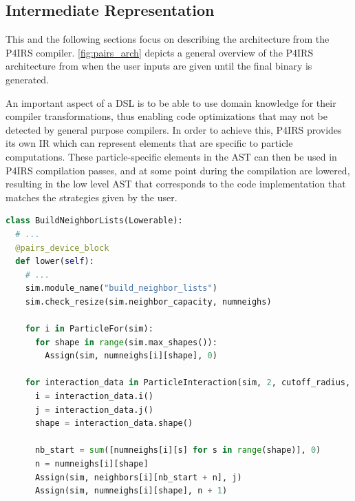 \documentclass[Afour,sageh,times]{sagej}
\newcommand{\RMchange}[1]{{\color{blue} #1}}
\begin{document}
\subsection{\RMchange{Intermediate Representation}}

\RMchange{This and the following sections focus on describing the architecture from the P4IRS compiler.
\autoref{fig:pairs_arch} depicts a general overview of the P4IRS architecture from when the user inputs are given until the final binary is generated.

An important aspect of a \ac{DSL} is to be able to use domain knowledge for their compiler transformations, thus enabling code optimizations that may not be detected by general purpose compilers.
In order to achieve this, P4IRS provides its own IR which can represent elements that are specific to particle computations.
These particle-specific elements in the AST can then be used in P4IRS compilation passes, and at some point during the compilation are lowered, resulting in the low level AST that corresponds to the code implementation that matches the strategies given by the user.}

\begin{lstlisting}[language=Python,
                   label={lst:build_neigh},
                   caption={Neighbor-lists intermediate representation construction in P4IRS. Elements that are explicitly built for the AST (both high and low level) are shown in purple, and implicit elements such as expressions are constructed via operator-overloading and bound to a statement at some point in the construction.}]
class BuildNeighborLists(Lowerable):
  # ...
  @pairs_device_block
  def lower(self):
    # ...
    sim.module_name("build_neighbor_lists")
    sim.check_resize(sim.neighbor_capacity, numneighs)

    for i in ParticleFor(sim):
      for shape in range(sim.max_shapes()):
        Assign(sim, numneighs[i][shape], 0)

    for interaction_data in ParticleInteraction(sim, 2, cutoff_radius, use_cell_lists=True):
      i = interaction_data.i()
      j = interaction_data.j()
      shape = interaction_data.shape()

      nb_start = sum([numneighs[i][s] for s in range(shape)], 0)
      n = numneighs[i][shape]
      Assign(sim, neighbors[i][nb_start + n], j)
      Assign(sim, numneighs[i][shape], n + 1)
\end{lstlisting}
\end{document}
